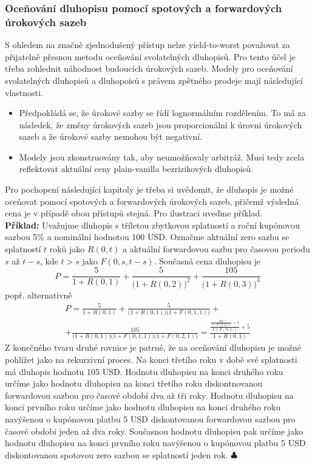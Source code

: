 \documentclass[a4paper]{book}
\begin{document}
\subsubsection{Oceňování dluhopisu pomocí spotových a forwardových úrokových sazeb}

S ohledem na značně zjednodušený přístup nelze yield-to-worst považovat za přijatelně přesnou metodu oceňování svolatelných dluhopisů. Pro tento účel je třeba zohlednit náhodnost budoucích úrokových sazeb. Modely pro oceňování svolatelných dluhopisů a dluhopoisů s právem zpětného prodeje mají následující vlastnosti.
\begin{itemize}
\item Předpokládá se, že úrokové sazby se řídí lognormálním rozdělením. To má za následek, že změny úrokových sazeb jsou proporcionální k úrovni úrokových sazeb a že úrokové sazby nemohou být negativní.
\item Modely jsou zkonstruovány tak, aby neumožňovaly arbitráž. Musí tedy zcela reflektovat aktuální ceny plain-vanilla bezrizikových dluhopisů.
\end{itemize}
Pro pochopení následující kapitoly je třeba si uvědomit, že dluhopis je možné oceňovat pomocí spotových a forwardových úrokových sazeb, přičemž výsledná cena je v případě obou přístupů stejná. Pro ilustraci uveďme příklad.\\

\noindent \textbf{Příklad:} Uvažujme dluhopis s tříletou zbytkovou splatností a roční kupónovou sazbou 5\% a nominální hodnotou 100 USD. Označme aktuální zero sazbu se splatností $t$ roků jako $R(0,t)$ a aktuální forwardovou sazbu pro časovou periodu $s$ až $t-s$, kde $t > s$ jako $F(0,s,t-s)$. Současná cena dluhopisu je
\begin{equation*}
P = \frac{5}{1 + R(0,1)} + \frac{5}{\big(1 + R(0,2)\big)^2} + \frac{105}{\big( 1 + R(0,3)\big)^3}
\end{equation*}
popř. alternativně
\begin{gather*}
P = \frac{5}{1 + R(0,1)} + \frac{5}{\big( 1 + R(0,1)\big)\big( 1 + F(0,1,1)\big)} + \\
 + \frac{105}{\big( 1 + R(0,1)\big)\big( 1 + F(0,1,1)\big)\big( 1 + F(0,2,1)\big)} = \frac{\frac{\frac{105}{1 + F(0,2,1)} + 5}{1 + F(0,1,)} + 5}{1 + R(0,1)}
\end{gather*}
Z konečného tvaru druhé rovnice je patrné, že na oceňování dluhopisu je možné pohlížet jako na rekurzivní proces. Na konci třetího roku v době své splatnosti má dluhopis hodnotu 105 USD. Hodnotu dluhopisu na konci druhého roku určíme jako hodnotu dluhopisu na konci třetího roku diskontnovanou forwardovou sazbou pro časové období dva až tři roky. Hodnotu dluhopisu na konci prvního roku určíme jako hodnotu dluhopisu na konci druhého roku navýšenou o kupónovou platbu 5 USD diskontovanou forwardovou sazbou pro časové období jeden až dva roky. Současnou hodnotu dluhopisu pak určíme jako hodnotu dluhopisu na konci prvního roku navýšenou o kupónovou platbu 5 USD diskontovanou spotovou zero sazbou se splatností jeden rok. $\clubsuit$\\
\end{document}

